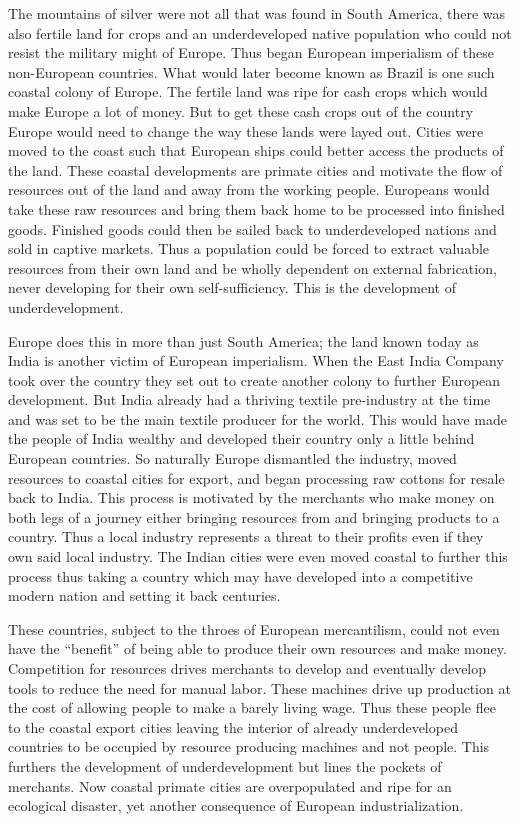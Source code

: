 \documentclass[a4paper, 12pt]{article}
\begin{document}
The mountains of silver were not all that was found in South America, there was also fertile land for crops and an underdeveloped native population who could not resist the military might of Europe. Thus began European imperialism of these non-European countries. What would later become known as Brazil is one such coastal colony of Europe. The fertile land was ripe for cash crops which would make Europe a lot of money. But to get these cash crops out of the country Europe would need to change the way these lands were layed out. Cities were moved to the coast such that European ships could better access the products of the land. These coastal developments are primate cities and motivate the flow of resources out of the land and away from the working people. Europeans would take these raw resources and bring them back home to be processed into finished goods. Finished goods could then be sailed back to underdeveloped nations and sold in captive markets. Thus a population could be forced to extract valuable resources from their own land and be wholly dependent on external fabrication, never developing for their own self-sufficiency. This is the development of underdevelopment.

Europe does this in more than just South America; the land known today as India is another victim of European imperialism. When the East India Company took over the country they set out to create another colony to further European development. But India already had a thriving textile pre-industry at the time and was set to be the main textile producer for the world. This would have made the people of India wealthy and developed their country only a little behind European countries. So naturally Europe dismantled the industry, moved resources to coastal cities for export, and began processing raw cottons for resale back to India. This process is motivated by the merchants who make money on both legs of a journey either bringing resources from and bringing products to a country. Thus a local industry represents a threat to their profits even if they own said local industry. The Indian cities were even moved coastal to further this process thus taking a country which may have developed into a competitive modern nation and setting it back centuries.

These countries, subject to the throes of European mercantilism, could not even have the ``benefit'' of being able to produce their own resources and make money. Competition for resources drives merchants to develop and eventually develop tools to reduce the need for manual labor. These machines drive up production at the cost of allowing people to make a barely living wage. Thus these people flee to the coastal export cities leaving the interior of already underdeveloped countries to be occupied by resource producing machines and not people. This furthers the development of underdevelopment but lines the pockets of merchants. Now coastal primate cities are overpopulated and ripe for an ecological disaster, yet another consequence of European industrialization.
\end{document}

